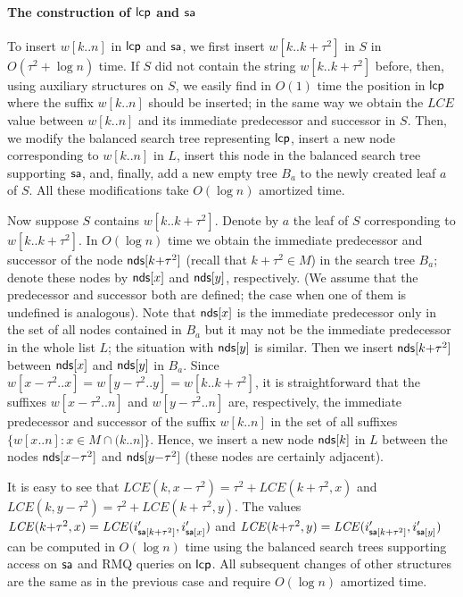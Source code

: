 \documentclass[3p,twocolumn]{elsarticle}
\theoremstyle{plain}
\theoremstyle{definition}
\newcommand{\LCE}{\mathit{LCE}}
\newcommand{\lcp}{{\sf lcp}}
\newcommand{\sa}{{\sf sa}}
\newcommand{\nodes}{{\sf nds}}
\begin{document}
\paragraph{The construction of $\lcp$ and $\sa$} To insert $w[k..n]$ in $\lcp$ and $\sa$, we first insert $w[k..k{+}\tau^2]$ in $S$ in $O(\tau^2 + \log n)$ time. If $S$ did not contain the string $w[k..k{+}\tau^2]$ before, then, using auxiliary structures on $S$, we easily find in $O(1)$ time the position in $\lcp$ where the suffix $w[k..n]$ should be inserted; in the same way we obtain the $\LCE$ value between $w[k..n]$ and its immediate predecessor and successor in $S$. Then, we modify the balanced search tree representing $\lcp$, insert a new node corresponding to $w[k..n]$ in $L$, insert this node in the balanced search tree supporting $\sa$, and, finally, add a new empty tree $B_a$ to the newly created leaf $a$ of $S$. All these modifications take $O(\log n)$ amortized time.

Now suppose $S$ contains $w[k..k{+}\tau^2]$. Denote by $a$ the leaf of $S$ corresponding to $w[k..k{+}\tau^2]$. In $O(\log n)$ time we obtain the immediate predecessor and successor of the node $\nodes[k{+}\tau^2]$ (recall that $k{+}\tau^2 \in M$) in the search tree $B_a$; denote these nodes by $\nodes[x]$ and $\nodes[y]$, respectively. (We assume that the predecessor and successor both are defined; the case when one of them is undefined is analogous). Note that $\nodes[x]$ is the immediate predecessor only in the set of all nodes contained in $B_a$ but it may not be the immediate predecessor in the whole list $L$; the situation with $\nodes[y]$ is similar. Then we insert $\nodes[k{+}\tau^2]$ between $\nodes[x]$ and $\nodes[y]$ in $B_a$. Since $w[x{-}\tau^2..x] = w[y{-}\tau^2..y] = w[k..k{+}\tau^2]$, it is straightforward that the suffixes $w[x{-}\tau^2..n]$ and $w[y{-}\tau^2..n]$ are, respectively, the immediate predecessor and successor of the suffix $w[k..n]$ in the set of all suffixes $\{w[x..n] \colon x\in M\cap (k..n]\}$. Hence, we insert a new node $\nodes[k]$ in $L$ between the nodes $\nodes[x{-}\tau^2]$ and $\nodes[y{-}\tau^2]$ (these nodes are certainly adjacent).

It is easy to see that $\LCE(k, x{-}\tau^2) = \tau^2 + \LCE(k{+}\tau^2, x)$ and $\LCE(k, y{-}\tau^2) = \tau^2 + \LCE(k{+}\tau^2, y)$. The values $\LCE(k{+}\tau^2, x) = \LCE(i'_{\sa[k{+}\tau^2]}, i'_{\sa[x]})$ and $\LCE(k{+}\tau^2, y) = \LCE(i'_{\sa[k{+}\tau^2]}, i'_{\sa[y]})$ can be computed in $O(\log n)$ time using the balanced search trees supporting access on $\sa$ and RMQ queries on $\lcp$. All subsequent changes of other structures are the same as in the previous case and require $O(\log n)$ amortized time.
\end{document}
